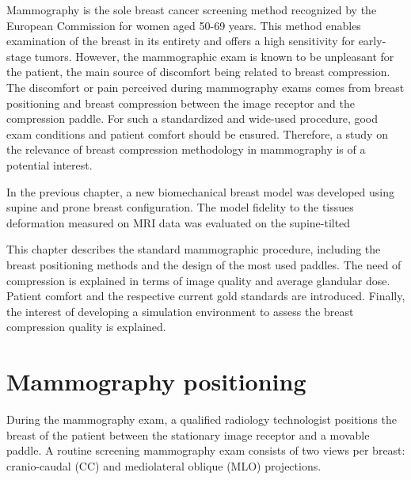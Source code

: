 

Mammography is the sole breast cancer screening method recognized by the European Commission for women aged 50-69 years. This method enables examination of the breast in its entirety and offers a high sensitivity for early-stage tumors. However, the mammographic exam is known to be unpleasant for the patient, the main source of discomfort being related to breast compression. The discomfort or pain perceived during mammography exams comes from breast positioning and breast compression between the image receptor and the compression paddle. For such a standardized and wide-used procedure, good exam conditions and patient comfort should be ensured. Therefore, a study on the relevance of breast compression methodology in mammography is of a potential interest.

In the previous chapter, a new biomechanical breast model was developed using supine and prone breast configuration. The model fidelity to the tissues deformation measured on MRI data was evaluated on the supine-tilted 

 This chapter describes the standard mammographic procedure, including the breast positioning methods and the design of the most used paddles. The need of compression is explained in terms of image quality and average glandular dose. Patient comfort and the respective current gold standards are introduced. Finally, the interest of developing a simulation environment to assess the breast compression quality is explained.

\clearpage
\section{Mammography positioning} \label{subsec:mammographicpositioning}

During the mammography exam, a qualified radiology technologist positions the breast of the patient between the stationary image receptor and a movable paddle. A routine screening mammography exam consists of two views per breast: cranio-caudal (CC) and mediolateral oblique (MLO) projections.  

